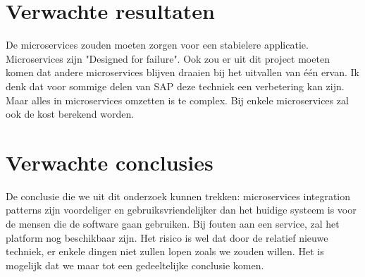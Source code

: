 \section{Verwachte resultaten}
\label{sec:verwachte_resultaten}
De microservices zouden moeten zorgen voor een stabielere applicatie. Microservices zijn "Designed for failure". Ook zou er uit dit project moeten komen dat andere microservices blijven draaien bij het uitvallen van één ervan.
Ik denk dat voor sommige delen van SAP deze techniek een verbetering kan zijn. Maar alles in microservices omzetten is te complex. Bij enkele microservices zal ook de kost berekend worden.  


\section{Verwachte conclusies}
\label{sec:verwachte_conclusies}

De conclusie die we uit dit onderzoek  kunnen trekken: microservices integration patterns zijn voordeliger en gebruiksvriendelijker dan het huidige systeem is voor de mensen die de software gaan gebruiken. Bij fouten aan een service, zal het platform nog beschikbaar zijn. Het risico is wel dat door de relatief nieuwe techniek, er enkele dingen niet zullen lopen zoals we zouden willen. Het is mogelijk dat we maar tot een gedeeltelijke conclusie komen.

